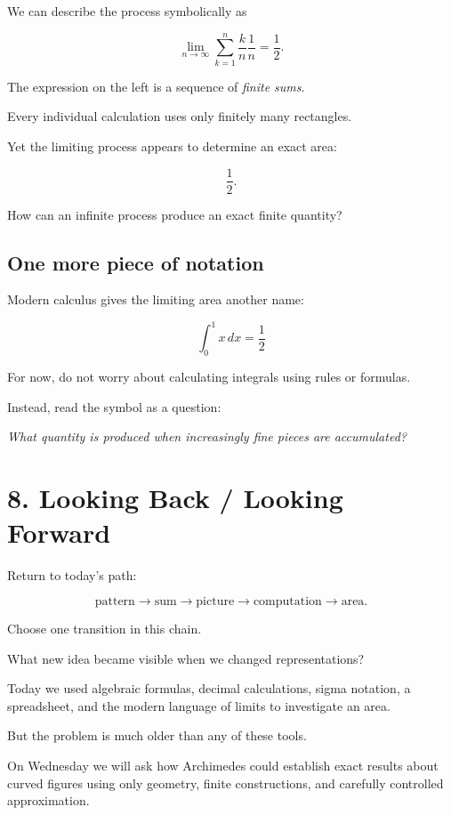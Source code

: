 \documentclass[11pt]{article}
\begin{document}
We can describe the process symbolically as

\[
\lim_{n\to\infty}
\sum_{k=1}^{n}
\frac{k}{n}\frac1n
=
\frac12.
\]


\begin{keyidea}
The expression on the left is a sequence of \emph{finite sums}.

Every individual calculation uses only finitely many rectangles.

Yet the limiting process appears to determine an exact area:

\[
\boxed{\frac12}.
\]

How can an infinite process produce an exact finite quantity?
\end{keyidea}


\subsection*{One more piece of notation}

Modern calculus gives the limiting area another name:

\[
\boxed{
\int_0^1 x\,dx=\frac12
}
\]

For now, do not worry about calculating integrals using rules or
formulas.

Instead, read the symbol as a question:

\begin{center}
\large
\emph{What quantity is produced when increasingly fine pieces
are accumulated?}
\end{center}


\section{8. Looking Back / Looking Forward}

Return to today's path:

\[
\text{pattern}
\longrightarrow
\text{sum}
\longrightarrow
\text{picture}
\longrightarrow
\text{computation}
\longrightarrow
\text{area}.
\]

Choose one transition in this chain.

What new idea became visible when we changed representations?

\vspace{0.65in}


\begin{historicalnote}
Today we used algebraic formulas, decimal calculations, sigma notation,
a spreadsheet, and the modern language of limits to investigate an area.

But the problem is much older than any of these tools.

On Wednesday we will ask how Archimedes could establish exact results
about curved figures using only geometry, finite constructions, and
carefully controlled approximation.
\end{historicalnote}
\end{document}

